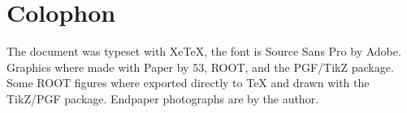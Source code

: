 \clearpage
\vspace*{3cm}
\section*{Colophon}
The document was typeset with Xe\TeX, the font is Source Sans Pro by Adobe.
Graphics where made with Paper by 53, ROOT, and the PGF/TikZ package.  Some ROOT figures where exported directly to \TeX
and drawn with the TikZ/PGF package.
Endpaper photographs are by the author.
